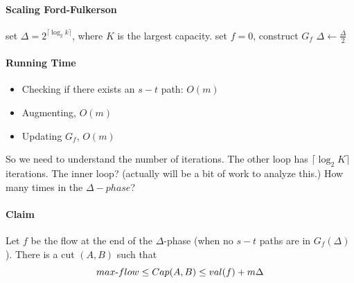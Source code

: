 \documentclass[12 pt]{article}
\begin{document}
        \paragraph{Scaling Ford-Fulkerson}
        \begin{algorithmic}
          \State set $\Delta=2^{\lceil \log_2 k \rceil}$, where $K$ is
          the largest capacity.
          \State set $f=0$, construct $G_f$
            \EndWhile
            \State $\Delta \gets \frac{\Delta}{2}$    
          \EndWhile
        \end{algorithmic}
        \paragraph{Running Time}
        \begin{itemize}
        \item Checking if there exists an $s-t$ path: $O(m)$
        \item Augmenting, $O(m)$
        \item Updating $G_f$, $O(m)$
        \end{itemize}
        So we need to understand the number of iterations.
        The other loop has $\lceil \log_2 K \rceil$ iterations. The
        inner loop? (actually will be a bit of work to analyze this.)
        How many times in the $\Delta-phase$?
        \paragraph{Claim} Let $f$
        be the flow at the end of the $\Delta$-phase (when no $s-t$
        paths are in $G_f(\Delta)$). There is a cut $(A,B)$ such
        that $$max\hbox{-}flow \leq Cap(A,B) \leq val(f)+m\Delta$$
\end{document}
